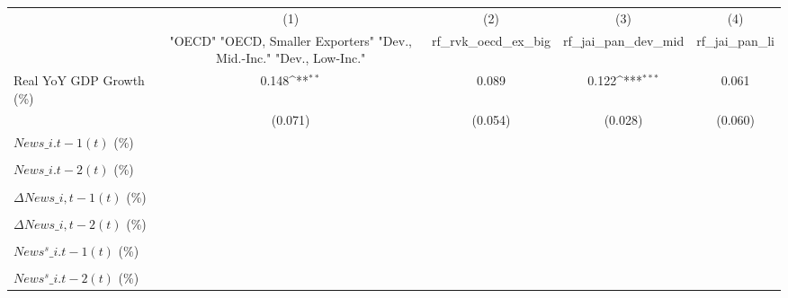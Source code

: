 {
\def\sym#1{\ifmmode^{#1}\else\(^{#1}\)\fi}
\begin{tabular}{l*{4}{c}}
\toprule
                    &\multicolumn{1}{c}{(1)}&\multicolumn{1}{c}{(2)}&\multicolumn{1}{c}{(3)}&\multicolumn{1}{c}{(4)}\\
                    &\multicolumn{1}{c}{ "OECD" "OECD, Smaller Exporters" "Dev., Mid.-Inc." "Dev., Low-Inc."}&\multicolumn{1}{c}{rf\_rvk\_oecd\_ex\_big}&\multicolumn{1}{c}{rf\_jai\_pan\_dev\_mid}&\multicolumn{1}{c}{rf\_jai\_pan\_li}\\
\midrule
Real YoY GDP Growth (\%)&       0.148\sym{**} &       0.089         &       0.122\sym{***}&       0.061         \\
                    &     (0.071)         &     (0.054)         &     (0.028)         &     (0.060)         \\
\addlinespace
$ News\_{i.t-1}(t)$ (\%)&                     &                     &                     &                     \\
                    &                     &                     &                     &                     \\
\addlinespace
$ News\_{i.t-2}(t)$ (\%)&                     &                     &                     &                     \\
                    &                     &                     &                     &                     \\
\addlinespace
$ \Delta News\_{i,t-1}(t)$ (\%)&                     &                     &                     &                     \\
                    &                     &                     &                     &                     \\
\addlinespace
$ \Delta News\_{i,t-2}(t)$ (\%)&                     &                     &                     &                     \\
                    &                     &                     &                     &                     \\
\addlinespace
$ News^s\_{i.t-1}(t)$ (\%)&                     &                     &                     &                     \\
                    &                     &                     &                     &                     \\
\addlinespace
$ News^s\_{i.t-2}(t)$ (\%)&                     &                     &                     &                     \\

\end{tabular}}
